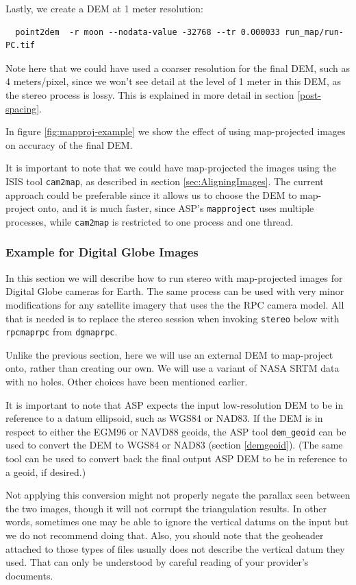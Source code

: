 Lastly, we create a DEM at 1 meter resolution:
\begin{verbatim}
  point2dem  -r moon --nodata-value -32768 --tr 0.000033 run_map/run-PC.tif
\end{verbatim}
Note here that we could have used a coarser resolution for the final
DEM, such as 4 meters/pixel, since we won't see detail at the level of
1 meter in this DEM, as the stereo process is lossy. This is
explained in more detail in section \ref{post-spacing}.

In figure \ref{fig:mapproj-example} we show the effect of using
map-projected images on accuracy of the final DEM.

It is important to note that we could have map-projected the images
using the ISIS tool \texttt{cam2map}, as described in section
\ref{sec:AligningImages}. The current approach could be preferable since
it allows us to choose the DEM to map-project onto, and it is much faster,
since ASP's \texttt{mapproject} uses multiple processes, while \texttt{cam2map}
is restricted to one process and one thread.

\subsubsection{Example for Digital Globe Images}
\label{dg-mapproj}

In this section we will describe how to run stereo with map-projected
images for Digital Globe cameras for Earth. The same process can be used
with very minor modifications for any satellite imagery that uses the
the RPC camera model. All that is needed is to replace the stereo
session when invoking \texttt{stereo} below with \texttt{rpcmaprpc} from
\texttt{dgmaprpc}.

Unlike the previous section, here we will use an external DEM to map-project
onto, rather than creating our own. We will use a variant of NASA
SRTM data with no holes. Other choices have been mentioned earlier.

It is important to note that ASP expects the input low-resolution DEM to
be in reference to a datum ellipsoid, such as WGS84 or NAD83. If the DEM
is in respect to either the EGM96 or NAVD88 geoids, the ASP tool
\texttt{dem\_geoid} can be used to convert the DEM to WGS84 or NAD83
(section \ref{demgeoid}). (The same tool can be used to convert back the
final output ASP DEM to be in reference to a geoid, if desired.)

Not applying this conversion might not properly negate the parallax
seen between the two images, though it will not corrupt the
triangulation results. In other words, sometimes one may be able to
ignore the vertical datums on the input but we do not recommend
doing that. Also, you should note that the geoheader attached to those
types of files usually does not describe the vertical datum they
used. That can only be understood by careful reading of your
provider's documents.

